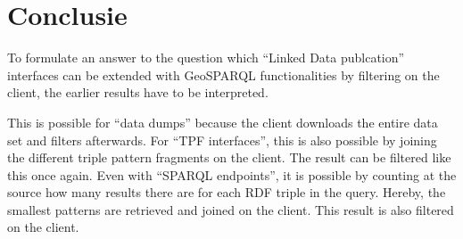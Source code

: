 \documentclass[twocolumn]{phdsymp} %
\begin{document}
\section{Conclusie}
To formulate an answer to the question which ``Linked Data publcation'' interfaces can be extended with GeoSPARQL functionalities by filtering on the client, the earlier results have to be interpreted.

This is possible for ``data dumps'' because the client downloads the entire data set and filters afterwards. For ``TPF interfaces'', this is also possible by joining the different triple pattern fragments on the client. The result can be filtered like this once again. Even with ``SPARQL endpoints'', it is possible by counting at the source how many results there are for each RDF triple in the query. Hereby, the smallest patterns are retrieved and joined on the client. This result is also filtered on the client.



\end{document}
